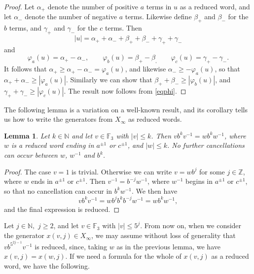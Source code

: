 \documentclass[twoside,11pt]{amsart}
\numberwithin{equation}{section}
\newtheorem{lemma}[theorem]{Lemma}
\theoremstyle{definition}
\newcommand {\N}{\mathbb N}
\newcommand {\Z}{\mathbb Z}
\newcommand{\1}{\mathbbm{1}}
\newcommand{\F}{\mathbb F}
\begin{document}
	\begin{proof}
		Let $\alpha_+$ denote the number of positive $a$ terms in $u$ as a reduced word, and let $\alpha_-$ denote the number of negative $a$ terms. Likewise define $\beta_+$ and $\beta_-$ for the $b$ terms, and $\gamma_+$ and $\gamma_-$ for the $c$ terms. Then
		\begin{equation}		\label{eqphi}
			|u| = {\alpha_+} + {\alpha _-} + {\beta_+} + {\beta_-} + {\gamma_+} + {\gamma_-}
		\end{equation}
		and
		$$\varphi_a(u) = \alpha_+ - \alpha_-, \qquad \varphi_b(u) = \beta_+ - \beta_, \qquad \varphi_c(u) = \gamma_+- \gamma_-.$$
		It follows that $\alpha_+ \geq \alpha_+ - \alpha_- = \varphi_a(u)$, and likewise $\alpha_- \geq -\varphi_a(u)$, so that $\alpha_+ + \alpha_- \geq |\varphi_a(u)|.$ Similarly we can show that $\beta_+ + \beta_- \geq |\varphi_b(u)|$, and $\gamma_+ + \gamma_- \geq |\varphi_c(u)|.$ The result now follows from \eqref{eqphi}.
	\end{proof}
	
	The following lemma is a variation on a well-known result, and its corollary tells us how to write the generators from $X_\infty$ as reduced words.
	
	\begin{lemma} 		\label{3.1}
		Let $k \in \N$ and let $v \in \F_3$ with $|v| \leq k$. Then $vb^kv^{-1} = w b^k w^{-1}$, where $w$ is a reduced word ending in $a^{\pm 1}$ or $c^{\pm 1}$, and $|w| \leq k $. No further cancellations can occur between $w$, $w^{-1}$ and $b^k$.
	\end{lemma}
	
	\begin{proof}
		The case $v = 1$ is trivial. Otherwise we can write $v = wb^j$ for some $j \in \Z$, where $w$ ends in $a^{\pm 1}$ or $c^{\pm 1}$. Then $v^{-1} = b^{-j}w^{-1}$, where $w^{-1}$ begins in $a^{\pm 1}$ or $c^{\pm 1}$, so that no cancellation can occur in $b^kw^{-1}$. We then have
		$$vb^kv^{-1} = wb^j b^k b^{-j} w^{-1} = wb^k w^{-1},$$
		and the final expression is reduced.
	\end{proof}
	
	Let $j \in \N,$ $j \geq 2$, and let $v \in \F_3$ with $|v| \leq 5^j$. From now on, when we consider the generator $x(v,j) \in X_\infty$, we may assume without loss of generality that $vb^{5^{2j-1}}v^{-1}$ is reduced, since, taking $w$ as in the previous lemma, we have $x(v,j) = x(w,j)$. If we need a formula for the whole of $x(v,j)$ as a reduced word, we have the following.
	
\end{document}
